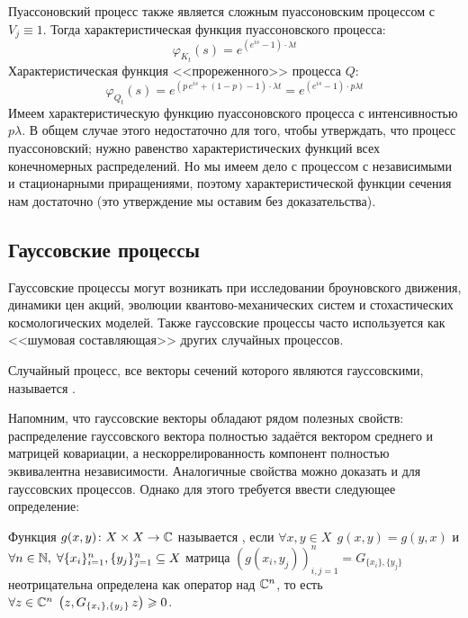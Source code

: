\begin{solution}
    Пуассоновский процесс также является сложным пуассоновским процессом с $ V_j \equiv 1 $.
    Тогда характеристическая функция пуассоновского процесса:
    \[
        \varphi_{K_t}(s) = e^{\left(e^{i s} - 1 \right) \cdot \lambda t}
    \]
    Характеристическая функция <<прореженного>> процесса $ Q $:
    \[
        \varphi_{Q_t}(s) = e^{\left(p \, e^{i s} + (1 - p) - 1 \right) \cdot \lambda t} = e^{\left(e^{i s} - 1 \right) \cdot p \lambda t}
    \]
    Имеем характеристическую функцию пуассоновского процесса с интенсивностью $ p \lambda $.
    В общем случае этого недостаточно для того, чтобы утверждать, что процесс пуассоновский;
    нужно равенство характеристических функций всех конечномерных распределений.
    Но мы имеем дело с процессом с независимыми и стационарными приращениями,
    поэтому характеристической функции сечения нам достаточно
    (это утверждение мы оставим без доказательства).
\end{solution}




\subsection{Гауссовские процессы} \label{subsection:gaussian}

Гауссовские процессы могут возникать при исследовании броуновского движения,
динамики цен акций, эволюции квантово-механических систем и стохастических космологических моделей.
Также гауссовские процессы часто используется как <<шумовая составляющая>> других случайных процессов.

\begin{definition}
    \label{definition:special:gaussian_process}
    Случайный процесс, все векторы сечений которого являются гауссовскими,
    называется .
\end{definition}

Напомним, что гауссовские векторы обладают рядом полезных свойств:
распределение гауссовского вектора полностью задаётся вектором среднего и матрицей ковариации,
а нескоррелированность компонент полностью эквивалентна независимости.
Аналогичные свойства можно доказать и для гауссовских процессов.
Однако для этого требуется ввести следующее определение:

\begin{definition}
    \label{definition:special:positive_semi_definite_function}
    Функция $ g(x, y) \colon X \times X \to \mathbb{C} $ называется ,
    если $ \forall x, y \in X \;\, g(x, y) = g(y, x) $ и $ \forall n \in \mathbb{N}, \; \forall \{x_i\}_{i=1}^n, \{y_j\}_{j=1}^n \subseteq X $
    матрица $ (g(x_i, y_j))_{i,j=1}^n = G_{\{x_i\}, \{y_j\}} $ неотрицательна определена как оператор над $ \mathbb{C}^n $,
    то есть $ \forall z \in \mathbb{C}^n \; \left(z, G_{\{x_i\}, \{y_j\}} \, z\right) \geqslant 0 $.
\end{definition}


